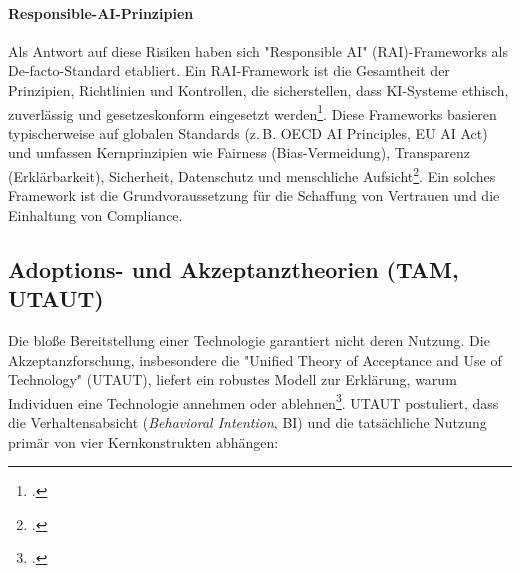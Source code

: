 \documentclass[12pt,a4paper,oneside]{article} %
\begin{document}
\paragraph{Responsible-AI-Prinzipien}
Als Antwort auf diese Risiken haben sich "Responsible AI" (RAI)-Frameworks als De-facto-Standard etabliert. Ein RAI-Framework ist die Gesamtheit der Prinzipien, Richtlinien und Kontrollen, die sicherstellen, dass KI-Systeme ethisch, zuverlässig und gesetzeskonform eingesetzt werden\footcite{Nemko2025RAIFramework}. Diese Frameworks basieren typischerweise auf globalen Standards (z.\,B. OECD AI Principles, EU AI Act) und umfassen Kernprinzipien wie Fairness (Bias-Vermeidung), Transparenz (Erklärbarkeit), Sicherheit, Datenschutz und menschliche Aufsicht\footcite{Cognizant2025RAIPrinciples}. Ein solches Framework ist die Grundvoraussetzung für die Schaffung von Vertrauen und die Einhaltung von Compliance.

\subsection{Adoptions- und Akzeptanztheorien (TAM, UTAUT)}
Die bloße Bereitstellung einer Technologie garantiert nicht deren Nutzung. Die Akzeptanzforschung, insbesondere die "Unified Theory of Acceptance and Use of Technology" (UTAUT), liefert ein robustes Modell zur Erklärung, warum Individuen eine Technologie annehmen oder ablehnen\footcite{UTAUT2_Students_Cedtech2025}. UTAUT postuliert, dass die Verhaltensabsicht (\textit{Behavioral Intention}, BI) und die tatsächliche Nutzung primär von vier Kernkonstrukten abhängen:
\end{document}

